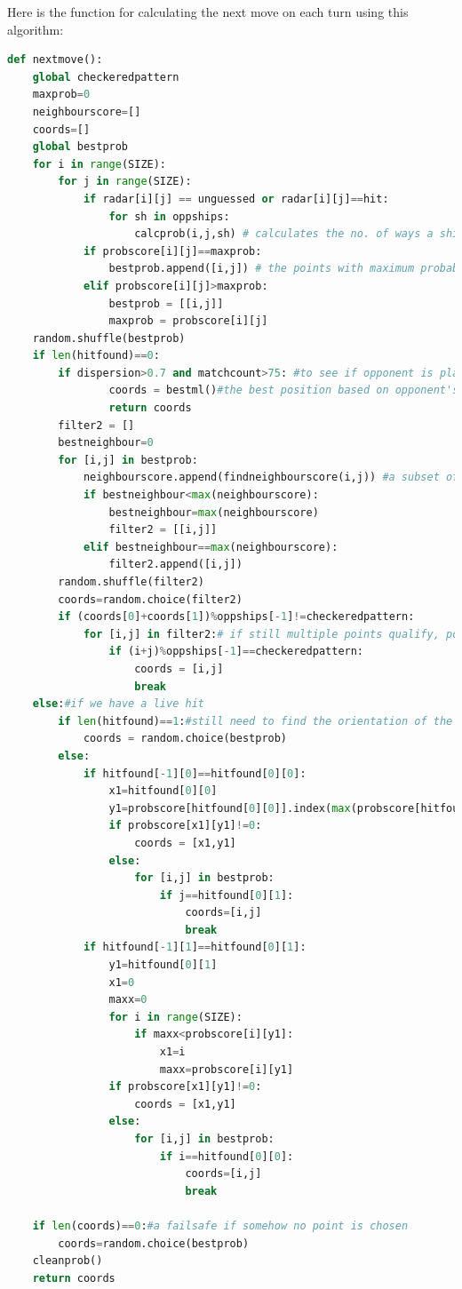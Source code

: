 \documentclass{article}
\begin{document}
\newline
Here is the function for calculating the next move on each turn using this algorithm:	
\begin{lstlisting}[language=python,tabsize=2,frame=single,breaklines=true]
def nextmove():
	global checkeredpattern
	maxprob=0
	neighbourscore=[]
	coords=[]
	global bestprob
	for i in range(SIZE):
		for j in range(SIZE):
			if radar[i][j] == unguessed or radar[i][j]==hit:
				for sh in oppships:
					calcprob(i,j,sh) # calculates the no. of ways a ship can be placed on a given point
			if probscore[i][j]==maxprob:
				bestprob.append([i,j]) # the points with maximum probability are placed in bestprob
			elif probscore[i][j]>maxprob:
				bestprob = [[i,j]]
				maxprob = probscore[i][j]
	random.shuffle(bestprob)
	if len(hitfound)==0:	
		if dispersion>0.7 and matchcount>75: #to see if opponent is placing ships in a pattern or not
				coords = bestml()#the best position based on opponent's history
				return coords
		filter2 = []
		bestneighbour=0
		for [i,j] in bestprob:
			neighbourscore.append(findneighbourscore(i,j)) #a subset of bestprob
			if bestneighbour<max(neighbourscore):
				bestneighbour=max(neighbourscore)
				filter2 = [[i,j]]
			elif bestneighbour==max(neighbourscore):
				filter2.append([i,j])
		random.shuffle(filter2)
		coords=random.choice(filter2)
		if (coords[0]+coords[1])%oppships[-1]!=checkeredpattern:
			for [i,j] in filter2:# if still multiple points qualify, points on the checkerboard are preferred
				if (i+j)%oppships[-1]==checkeredpattern:
					coords = [i,j]
					break
	else:#if we have a live hit
		if len(hitfound)==1:#still need to find the orientation of the ship
			coords = random.choice(bestprob)
		else:
			if hitfound[-1][0]==hitfound[0][0]:
				x1=hitfound[0][0]
				y1=probscore[hitfound[0][0]].index(max(probscore[hitfound[0][0]]))
				if probscore[x1][y1]!=0:
					coords = [x1,y1]
				else:
					for [i,j] in bestprob:
						if j==hitfound[0][1]:
							coords=[i,j]
							break
			if hitfound[-1][1]==hitfound[0][1]:
				y1=hitfound[0][1]
				x1=0
				maxx=0
				for i in range(SIZE):
					if maxx<probscore[i][y1]:
						x1=i
						maxx=probscore[i][y1]
				if probscore[x1][y1]!=0:
					coords = [x1,y1]
				else:
					for [i,j] in bestprob:
						if i==hitfound[0][0]:
							coords=[i,j]
							break
						
	if len(coords)==0:#a failsafe if somehow no point is chosen
		coords=random.choice(bestprob)
	cleanprob()
	return coords
\end{lstlisting}
\end{document}
